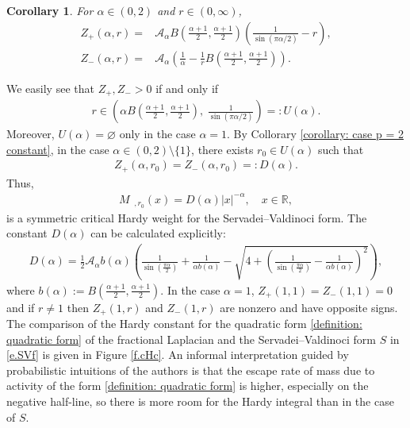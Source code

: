 \documentclass[12pt, a4paper]{amsart}
\newtheorem{corollary}[theorem]{Corollary}
\DeclareMathOperator{\mass}{\widetilde{\nu}_{\alpha}}
\newcommand{\R}{\mathbb{R}}
\begin{document}
\begin{corollary} For $\alpha \in (0, 2)$ and $r \in (0, \infty)$,
    \begin{align*}
    Z_{+}(\alpha, r) = & \mathcal{A}_\alpha B\left(\frac{\alpha+1}{2},\frac{\alpha+1}{2}\right) \left(\frac{1}{\sin(\pi\alpha/2)} - r \right),
    \\
    Z_{-}(\alpha, r) = & \mathcal{A}_\alpha\left ( \frac{1}{\alpha} - \frac{1}{r}B\left(\frac{\alpha+1}{2},\frac{\alpha+1}{2}\right) \right ).
\end{align*}
\end{corollary}
We easily see  that $Z_+, Z_- > 0$ if and only if
\begin{align*}
    r \in \left ( \alpha B \left( \frac{\alpha + 1}{2}, \frac{\alpha + 1}{2} \right), \; \frac{1}{\sin(\pi\alpha/2)}\right) =: U(\alpha). 
\end{align*}
Moreover, $U(\alpha) = \varnothing$ only in the case $\alpha = 1$. By Collorary \cref{corollary: case p = 2 constant}, in the case $\alpha \in (0, 2) \setminus \{1\}$, there exists $r_0 \in U(\alpha)$ such that
\begin{align*}
    Z_+(\alpha, r_0) = Z_-(\alpha, r_0) =: D(\alpha).
\end{align*}
Thus,
\begin{align*}
    M_{\mass, r_0}(x) = D(\alpha)|x|^{-\alpha}, \quad x\in \R,
\end{align*}
is a symmetric critical Hardy weight for the Servadei--Valdinoci form.
The constant $D(\alpha)$ can be calculated explicitly: 
\begin{align}\label{e.sSV}
    D(\alpha) = \frac{1}{2}\mathcal{A}_\alpha b(\alpha)\left ( \frac{1}{ \sin{\left( \frac{\pi\alpha}{2} \right)}} + \frac{1}{\alpha b(\alpha)} - \sqrt{4 
    +\left ( \frac{1}{ \sin{\left( \frac{\pi\alpha}{2} \right)}} - \frac{1}{\alpha b(\alpha)}  \right )^2} \right ),
\end{align}
where $b(\alpha) := B\left(\frac{\alpha+1}{2},\frac{\alpha+1}{2}\right)$.
In the case $\alpha = 1$, $Z_+(1, 1) = Z_-(1, 1) = 0$ and if $r \neq 1$ then $Z_+(1, r)$ and $Z_-(1, r)$ are  nonzero and have opposite signs.
The comparison of the Hardy constant for the quadratic form \eqref{definition: quadratic form} of the fractional Laplacian  and the Servadei--Valdinoci form $S$ in \eqref{e.SVf} is given in Figure \ref{f.cHc}. An informal interpretation guided by probabilistic intuitions of the authors is that the escape rate of mass due to activity of the form \eqref{definition: quadratic form} is higher, especially on the negative half-line, so there is  more room for the Hardy integral than in the case of $S$.
\end{document}
